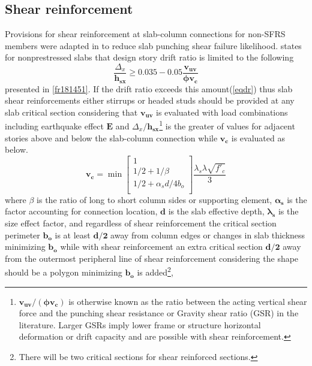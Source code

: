 \documentclass[twocolumn]{article} %
\begin{document}
\subsection{Shear reinforcement}
Provisions for shear reinforcement at slab-column connections for non-SFRS members were adapted in \cite{aci31805} to reduce slab punching shear failure likelihood. \citet[Section 18.14.5]{aci31819} states for nonprestressed slabs that design story drift ratio is limited to the following
\begin{equation}\label{eqdr}
\frac{\Delta_x}{\mathbf{h_{sx}}}\ge\mathbf{0.035-0.05\frac{v_{uv}}{\phi v_c}}
\end{equation}
presented in \ref{fr181451}.
If the drift ratio exceeds this amount(\ref{eqdr}) thus slab shear reinforcements either stirrups or headed studs should be provided at any slab critical section considering that $\mathbf{v_{uv}}$ is evaluated with load combinations including earthquake effect $\mathbf{E}$ and $\Delta_x/\mathbf{h_{sx}}$\footnote{$\mathbf{v_{uv}/(\phi v_c)}$ is otherwise known as the ratio between the acting vertical shear force and the punching shear resistance or Gravity shear ratio (GSR) in the literature. Larger GSRs imply lower frame or structure horizontal deformation or drift capacity and are possible with shear reinforcement\citep{gouveia2019}.} is the greater of values for adjacent stories above and below the slab-column connection while $\mathbf{v_c}$ is evaluated as below. 
\begin{equation}\label{eqt22652}
\mathbf{v_c} = \min{\left[\begin{array}{c}
1\\
1/2+{1}/{\beta}\\
1/2+{\alpha_sd}/{4b_o}\\
\end{array}\right]}
\frac{\lambda_s\lambda\sqrt{f'_c}}{3}
\end{equation}
where $\beta$ is the ratio of long to short column sides or supporting element, $\mathbf{\alpha_s}$ is the factor accounting for connection location, $\mathbf{d}$ is the slab effective depth, $\mathbf{\lambda_s}$ is the size effect factor, and regardless of shear reinforcement the critical section perimeter $\mathbf{b_o}$ is at least $\mathbf{d/2}$ away from column edges or changes in slab thickness minimizing $\mathbf{b_o}$ while with shear reinforcement an extra critical section $\mathbf{d/2}$ away from the outermost peripheral line of shear reinforcement considering the shape should be a polygon minimizing $\mathbf{b_o}$ is added\footnote{There will be two critical sections for shear reinforced sections.}, 
\end{document}

